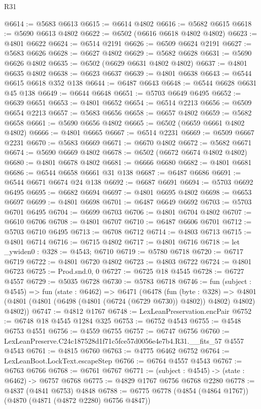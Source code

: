 \begin{lexlean}{R31}
\begin{coremodule}
@6614 := @5683 @6613
@6615 := @6614 @4802
@6616 := @5682 @6615
@6618 := @5690 @6613 @4802
@6622 := @6502 (@6616 @6618 @4802 @4802)
@6623 := @4801 @6622
@6624 := @6514 @2191
@6626 := @6509 @6624 @2191
@6627 := @5683 @6626
@6628 := @6627 @4802
@6629 := @5682 @6628
@6631 := @5690 @6626 @4802
@6635 := @6502 (@6629 @6631 @4802 @4802)
@6637 := @4801 @6635 @4802
@6638 := @6623 @6637
@6639 := @4801 @6638
@6643 := @6544 @6615 @6618 @352 @138
@6644 := @6487 @6643
@6648 := @6544 @6628 @6631 @45 @138
@6649 := @6644 @6648
@6651 := @5703 @6649 @6495
@6652 := @6639 @6651
@6653 := @4801 @6652
@6654 := @6514 @2213
@6656 := @6509 @6654 @2213
@6657 := @5683 @6656
@6658 := @6657 @4802
@6659 := @5682 @6658
@6661 := @5690 @6656 @4802
@6665 := @6502 (@6659 @6661 @4802 @4802)
@6666 := @4801 @6665
@6667 := @6514 @2231
@6669 := @6509 @6667 @2231
@6670 := @5683 @6669
@6671 := @6670 @4802
@6672 := @5682 @6671
@6674 := @5690 @6669 @4802
@6678 := @6502 (@6672 @6674 @4802 @4802)
@6680 := @4801 @6678 @4802
@6681 := @6666 @6680
@6682 := @4801 @6681
@6686 := @6544 @6658 @6661 @31 @138
@6687 := @6487 @6686
@6691 := @6544 @6671 @6674 @24 @138
@6692 := @6687 @6691
@6694 := @5703 @6692 @6495
@6695 := @6682 @6694
@6697 := @4801 @6695 @4802
@6698 := @6653 @6697
@6699 := @4801 @6698
@6701 := @6487 @6649 @6692
@6703 := @5703 @6701 @6495
@6704 := @6699 @6703
@6706 := @4801 @6704 @4802
@6707 := @6610 @6706
@6708 := @4801 @6707
@6710 := @6487 @6606 @6701
@6712 := @5703 @6710 @6495
@6713 := @6708 @6712
@6714 := @4803 @6713
@6715 := @4801 @6714
@6716 := @6715 @4802
@6717 := @4801 @6716
@6718 := let _ywiden0 : @328 := @4543; @6710
@6719 := @5780 @6718
@6720 := @6717 @6719
@6722 := @4801 @6720 @4802
@6723 := @4803 @6722
@6724 := @4801 @6723
@6725 := Prod.snd.{0, 0}
@6727 := @6725 @18 @4545
@6728 := @6727 @4557
@6729 := @5035 @6728
@6730 := @5783 @6718
@6746 := fun (subject : @4545) =>
  fun (state : @6462) =>
  @6471
    (@6478
      (fun (byte : @328) =>
      @4801 (@4801 (@4801 (@6498 (@4801 (@6724 (@6729 @6730)) @4802)) @4802) @4802) @4802))
@6747 := @4812 @1767
@6748 := LexLeanPreservation.encPair
@6752 := @6748 @18 @4545 @1284 @325
@6753 := @6752 @4543
@6755 := @4548 @6753 @4551
@6756 := @4559 @6755
@6757 := @6747 @6756
@6760 := LexLeanPreserve.C24c187528d1f71c5fce57d0056e4e7b4.R31.__fits_57 @4557 @4543
@6761 := @4815 @6760
@6763 := @4775 @6462 @6752
@6764 := LexLeanBoot.LockText.escapeStep
@6766 := @6764 @4557 @4543
@6767 := @6763 @6766
@6768 := @6761 @6767
@6771 := (subject : @4545) -> (state : @6462) -> @6757 @6768
@6775 := @4829 @1767 @6756 @6768 @2280
@6778 := @4837 (@4841 @6753) @4848
@6788 := @6775 @6778 (@4854 (@4864 @1767)) (@4870 (@4871 (@4872 @2280) @6756 @4847))

\end{coremodule}
\end{lexlean}
